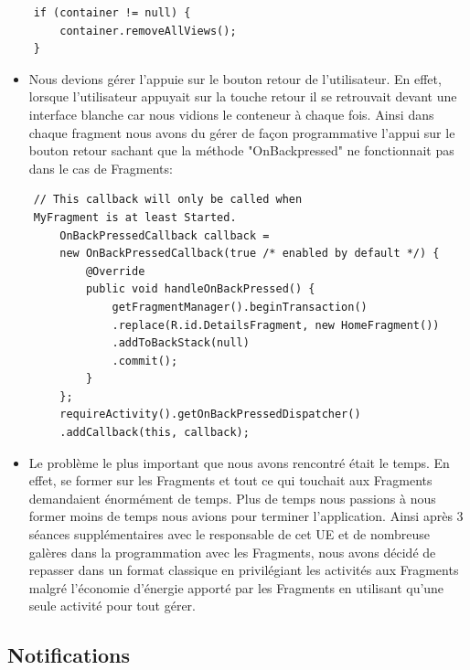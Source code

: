\documentclass[12pt,a4paper]{report}
\begin{document}
\begin{flushleft}
\begin{itemize}
\end{itemize}
\begin{lstlisting}
	if (container != null) {
		container.removeAllViews();
	}
\end{lstlisting}
\begin{itemize}
\item Nous devions gérer l'appuie sur le bouton retour de l'utilisateur. En effet, lorsque l'utilisateur appuyait sur la touche retour il se retrouvait devant une interface blanche car nous vidions le conteneur à chaque fois. Ainsi dans chaque fragment nous avons du gérer de façon programmative l'appui sur le bouton retour sachant que la méthode "OnBackpressed" ne fonctionnait pas dans le cas de Fragments:
\end{itemize}
\begin{lstlisting}
	// This callback will only be called when 
	MyFragment is at least Started.
        OnBackPressedCallback callback = 
        new OnBackPressedCallback(true /* enabled by default */) {
            @Override
            public void handleOnBackPressed() {
                getFragmentManager().beginTransaction()
                .replace(R.id.DetailsFragment, new HomeFragment())
                .addToBackStack(null)
                .commit();
            }
        };
        requireActivity().getOnBackPressedDispatcher()
        .addCallback(this, callback);
\end{lstlisting}
\begin{itemize}
\item Le problème le plus important que nous avons rencontré était le temps. En effet, se former sur les Fragments et tout ce qui touchait aux Fragments demandaient énormément de temps. Plus de temps nous passions à nous former moins de temps nous avions pour terminer l'application. Ainsi après 3 séances supplémentaires avec le responsable de cet UE et de nombreuse galères dans la programmation avec les Fragments, nous avons décidé de repasser dans un format classique en privilégiant les activités aux Fragments malgré l'économie d'énergie apporté par les Fragments en utilisant qu'une seule activité pour tout gérer.
\end{itemize}
\end{flushleft}
\subsection{Notifications}
\end{document}
